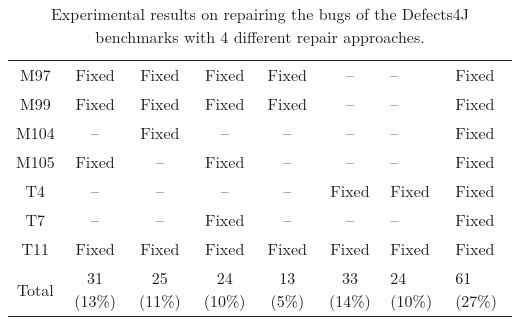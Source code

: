 \begin{table}[!t]
{\begin{tabular}{|c|c|c|c|c|c|}
M97               & Fixed     & Fixed     & Fixed     & Fixed     & --        & --        &Fixed   \\
M99               & Fixed     & Fixed     & Fixed     & Fixed     & --        & --        &Fixed   \\
M104              & --        & Fixed     & --        & --        & --        & --        &Fixed   \\
M105              & Fixed     & --        & Fixed     & --        & --        & --        &Fixed   \\
\hline
T4                & --        & --        & --        & --        & Fixed     & Fixed     &Fixed   \\
T7                & --        & --        & Fixed     & --        & --        & --        &Fixed   \\
T11               & Fixed     & Fixed     & Fixed     & Fixed     & Fixed     & Fixed     &Fixed   \\
\hline
Total             & 31 (13\%) & 25 (11\%) & 24 (10\%) & 13 (5\%)  & 33 (14\%) & 24 (10\%) & 61 (27\%)\\
\hline 
\end{tabular}%
}
\caption{Experimental results on repairing the bugs of the Defects4J benchmarks with 4 different repair approaches.}
\end{table}
